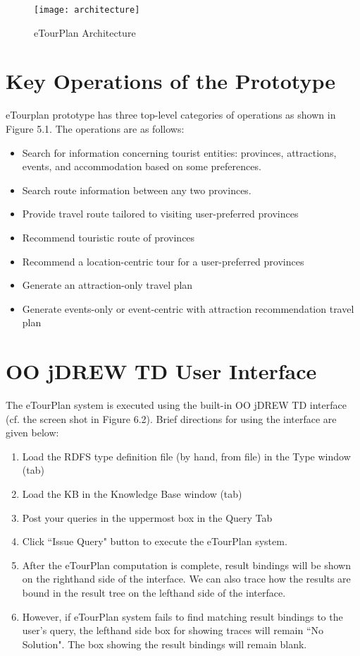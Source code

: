 \begin{figure}
\begin{center}
\texttt{[image: architecture]}
\caption {eTourPlan Architecture}
\label{fig:Fig6.1}
\end{center}
\end{figure}

\section{Key Operations of the Prototype}
\hspace{0.3in} eTourplan prototype has three top-level categories of operations as shown in Figure 5.1. The operations are as follows:
\begin{itemize}
\item Search for information concerning tourist entities: provinces, attractions, events, and accommodation based on some preferences.
 \item Search route information between any two provinces. 
 \item  Provide travel route tailored to visiting user-preferred provinces
 \item Recommend touristic route of provinces
\item  Recommend a location-centric tour for a user-preferred provinces
\item  Generate an attraction-only travel plan 
\item  Generate events-only or event-centric with attraction recommendation travel plan
\end{itemize}

\section{OO jDREW TD User Interface}

\hspace{0.3in}The eTourPlan system is executed using the built-in OO jDREW TD interface (cf. the screen shot in Figure 6.2).  Brief directions for using the interface are given below:
\begin{enumerate}
\item Load the RDFS type definition file (by hand, from file) in the Type window (tab)
\item Load the KB in the Knowledge Base window (tab)
 \item Post your queries in the uppermost box in the Query Tab
 \item Click ``Issue Query" button to execute the eTourPlan system.
 \item After the eTourPlan computation is complete, result bindings will be shown on the righthand side of the interface. We can also trace how the results are bound in the result tree on the lefthand side of the interface.
 \item However, if eTourPlan system fails to find matching result bindings to the user's query, the lefthand side box for showing traces will remain ``No Solution". The box showing the result bindings will remain blank.
\end{enumerate}

